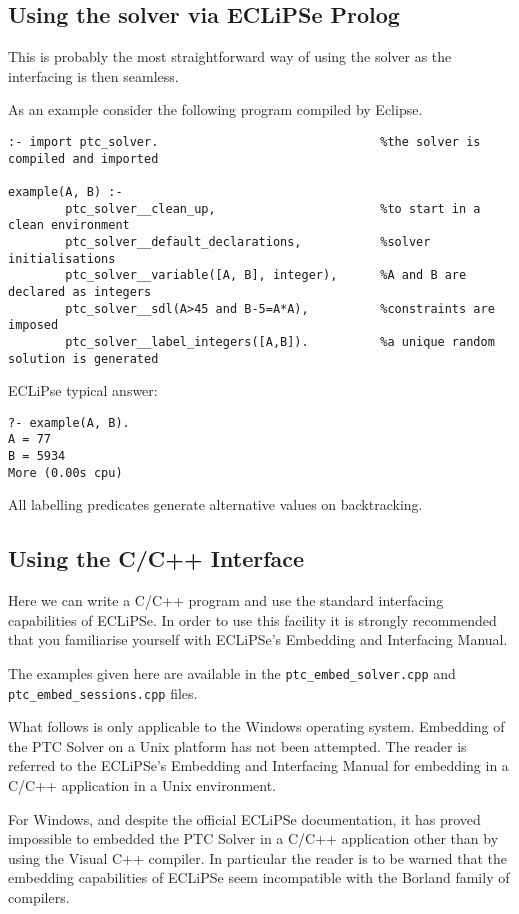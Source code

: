 \documentclass{article}
\begin{document}
\subsection{Using the solver via ECLiPSe Prolog}

This is probably the most straightforward way of using the solver as the
interfacing is
then seamless.

As an example consider the following program compiled by Eclipse.

\begin{verbatim}
:- import ptc_solver.                               %the solver is compiled and imported

example(A, B) :-
        ptc_solver__clean_up,                       %to start in a clean environment
        ptc_solver__default_declarations,           %solver initialisations
        ptc_solver__variable([A, B], integer),      %A and B are declared as integers
        ptc_solver__sdl(A>45 and B-5=A*A),          %constraints are imposed
        ptc_solver__label_integers([A,B]).          %a unique random solution is generated
\end{verbatim}

ECLiPse typical answer:

\begin{verbatim}
?- example(A, B).
A = 77
B = 5934
More (0.00s cpu)
\end{verbatim}

All labelling predicates generate alternative values on backtracking.

\subsection{Using the C/C++ Interface}

Here we can write a C/C++ program and use the standard interfacing capabilities
of ECLiPSe.
In order to use this facility it is strongly recommended that you familiarise
yourself
with ECLiPSe's Embedding and Interfacing Manual.

The examples given here are available in the \verb+ptc_embed_solver.cpp+ and
\verb+ptc_embed_sessions.cpp+ files.

What follows is only applicable to the Windows operating system. Embedding of
the PTC Solver on a Unix platform has not been attempted. The reader is referred
to the ECLiPSe's Embedding and Interfacing Manual for embedding in a C/C++
application in a Unix environment.

For Windows, and despite the official ECLiPSe documentation, it has proved
impossible to embedded the PTC Solver in a C/C++ application other than by using
the Visual C++ compiler. In particular the reader is to be warned that the
embedding capabilities of ECLiPSe seem incompatible with the Borland family of
compilers.
\end{document}
